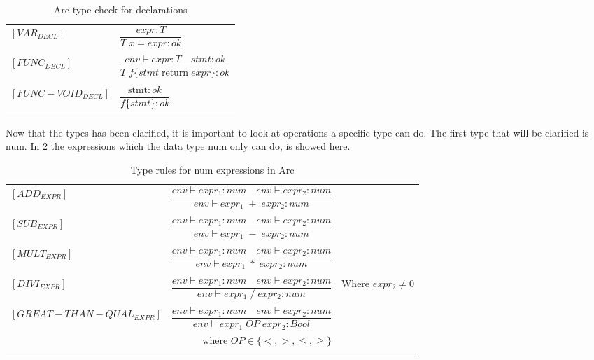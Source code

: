 \begin{table}[htb!]
    \centering
    \begin{tabular}{ll}
        $[VAR_{DECL}] $       & $\dfrac
            {expr : T}
            {T \;x = expr : ok}$
        \\
        \\
        $[FUNC_{DECL}] $      & $\dfrac
            {env \vdash expr : T \quad stmt : ok}
            {T \;f \{stmt \;\text{return} \; expr\}  : ok}$
        \\
        \\
        $[FUNC-VOID_{DECL}] $ & $\dfrac
            {\text{stmt} : ok}
            {f\{stmt\}  : ok}$
        \\
        \\
    \end{tabular}
    \caption{Arc type check for declarations}
    \label{tab:DeclTypeCheck}
\end{table}

Now that the types has been clarified, it is important to look at operations a specific type can do.
The first type that will be clarified is num.
In \ref{tab:num-rules} the expressions which the data type num only can do, is showed here.

\begin{table}[htb!]
    \centering
    \begin{tabular}{lr>{\raggedright\arraybackslash}p{6cm}}
        $[ADD_{EXPR}] $                         & $\dfrac
            {env\vdash expr_1: num \quad env\vdash expr_2: num}
            {env\vdash expr_1 \;+\;expr_2: num}$
        \\
        \\
        $[SUB_{EXPR}] $                         & $\dfrac
            {env\vdash expr_1: num \quad env\vdash expr_2: num}
            {env\vdash expr_1 \;-\;expr_2: num}$
        \\
        \\
        $[MULT_{EXPR}] $                        & $\dfrac
            {env\vdash expr_1: num \quad env\vdash expr_2: num}
            {env\vdash expr_1 \;*\;expr_2: num}$
        \\
        \\
        $[DIVI_{EXPR}] $                        & $\dfrac
            {env\vdash expr_1: num \quad env\vdash expr_2: num}
        {env\vdash expr_1 \; / \; expr_2: num}$ & Where $expr_2 \neq 0$
        \\
        \\
        $[GREAT-THAN-QUAL_{EXPR}] $             & $\dfrac
            {env\vdash expr_1: num \quad env\vdash expr_2: num}
            {env\vdash expr_1 \; OP \; expr_2: Bool}$                   \\ & where $OP \in \{<, >, \leq, \geq\}$

        \\
        \\
    \end{tabular}
    \caption{Type rules for num expressions in Arc}
    \label{tab:num-rules}
\end{table}

